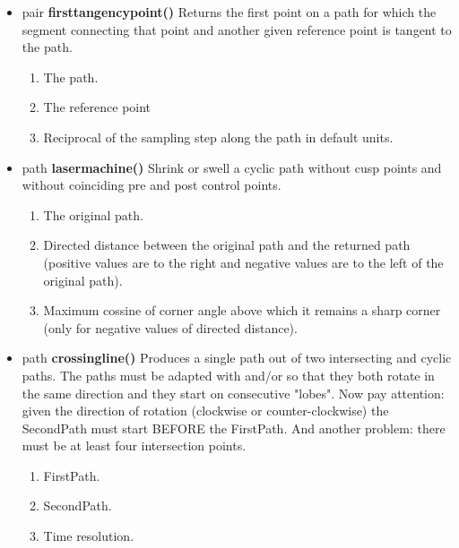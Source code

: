 \begin{itemize}
\item pair {\bfseries firsttangencypoint()} Returns the first point on
  a path for which the segment connecting that point and another given
  reference point is tangent to the path.
  \begin{enumerate}
  \item {} The path.
  \item {} The reference point
  \item {} Reciprocal of the sampling step along the path
    in default units.
  \end{enumerate}
\item path {\bfseries lasermachine()} Shrink or swell a cyclic path
  without cusp points and without 
  coinciding pre and post control points. 
  \begin{enumerate}
  \item {} The original path.
  \item {} Directed distance between the original path and the
    returned path (positive values are to the right and negative
    values are to the left of the original path).
  \item {} Maximum cossine of corner angle above which it
    remains a sharp corner (only for negative values of directed distance).
  \end{enumerate}
\item path {\bfseries crossingline()} Produces a single path out of
  two intersecting and cyclic paths. The paths must be adapted with
   and/or  so that they both rotate in the same
  direction and they start on consecutive "lobes".
  Now pay attention: given the direction of rotation (clockwise or
  counter-clockwise) the SecondPath must start BEFORE the FirstPath.
  And another problem: there must be at least four intersection points.
  \begin{enumerate}
  \item {} FirstPath.
  \item {} SecondPath.
  \item {} Time resolution.
  \end{enumerate}
\end{itemize}

